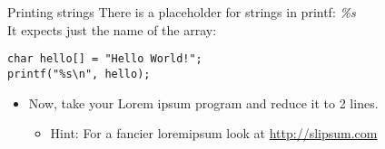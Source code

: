 \begin{frame}[fragile]{Printing strings}
	There is a placeholder for strings in printf: \textit{\%s}\\
	It expects just the name of the array:
	\begin{lstlisting}[numbers=none]
char hello[] = "Hello World!";
printf("%s\n", hello);
\end{lstlisting}
	\begin{itemize}
		\item Now, take your Lorem ipsum program and reduce it to 2 lines.
		\begin{itemize}
			\item<2-> Hint: For a fancier loremipsum look at \url{http://slipsum.com}
		\end{itemize}
	\end{itemize}
\end{frame}

